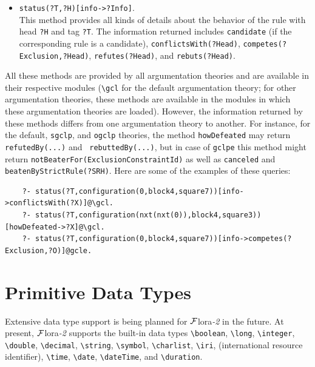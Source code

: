 \documentclass[11pt]{article}
\newcommand{\FLORA}{{\mbox{\sc ${\cal F}${lora}\rm\emph{-2}}}\xspace}
\newcommand{\FLSYSTEM}{\FLORA}
\newcommand{\bs}{\textbackslash}
\begin{document}
\begin{itemize}
  This literal is true if all the defeasible rules with tag \texttt{?T}
  and head \texttt{?H} have an opposing strict rule. In that case,
  \texttt{?SRH} is bound to the head of that opposing rule. 
\item  {\tt status(?T,?H)[info->?Info]}.\\
  This method provides all kinds of details about the behavior of the rule
  with head {\tt ?H} and tag {\tt ?T}. The information returned
  includes {\tt candidate} (if the corresponding rule is a candidate),
  {\tt conflictsWith(?Head)}, \texttt{competes(?Exclusion,?Head)},
  {\tt refutes(?Head)}, and
  {\tt rebuts(?Head)}.   
\end{itemize}
All these methods are provided by all argumentation theories and are
available in their respective modules ({\tt \bs{}gcl} for the default argumentation
theory; for other argumentation theories, these methods are available in
the modules in which these argumentation theories are loaded).
However,
the information returned by these methods differs from one argumentation theory
to another. For instance, for the default, \texttt{sgclp},
and {\tt ogclp} theories, the method
{\tt howDefeated} may return {\tt refutedBy(...)} and {\tt
  rebuttedBy(...)}, but in case of {\tt gclpe} this method might return
{\tt notBeaterFor(ExclusionConstraintId)} as well as \texttt{canceled} and
\texttt{beatenByStrictRule(?SRH)}.    
Here are some of the examples of these queries:
\begin{verbatim}
    ?- status(?T,configuration(0,block4,square7))[info->conflictsWith(?X)]@\gcl.
    ?- status(?T,configuration(nxt(nxt(0)),block4,square3))[howDefeated->?X]@\gcl.
    ?- status(?T,configuration(0,block4,square7))[info->competes(?Exclusion,?O)]@gcle.
\end{verbatim}


\section{Primitive Data Types}\label{sec-data-types}

Extensive data type support is being planned for \FLSYSTEM in the future.
At present, \FLSYSTEM supports the built-in data types
\texttt{\bs{}boolean}, 
{\tt \bs{}long}, \texttt{\bs{}integer},
{\tt \bs{}double},  \texttt{\bs{}decimal},
\texttt{\bs{}string}, {\tt \bs{}symbol}, \texttt{\bs{}charlist},
{\tt \bs{}iri}, (international resource identifier), {\tt \bs{}time}, {\tt \bs{}date},
{\tt \bs{}dateTime}, and {\tt \bs{}duration}.
\end{document}
